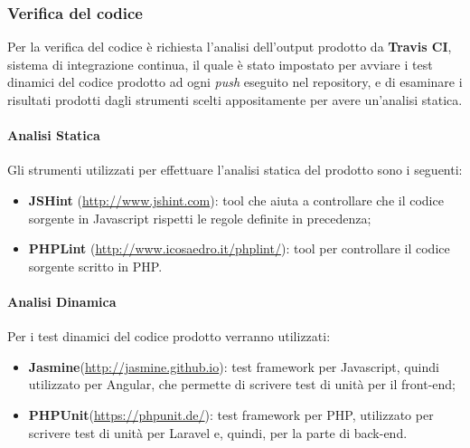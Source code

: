 \subsubsection{Verifica del codice}
Per la verifica del codice è richiesta l'analisi dell'output prodotto da \textbf{Travis CI}, sistema di integrazione continua, il quale è stato impostato per avviare i test dinamici del codice prodotto ad ogni \textit{push} eseguito nel \gls{repository}, e di esaminare i risultati prodotti dagli strumenti scelti appositamente per avere un'analisi statica.

	\paragraph{Analisi Statica}
	Gli strumenti utilizzati per effettuare l'analisi statica del prodotto sono i seguenti:
	\begin{itemize}
		\item \textbf{JSHint} (\url{http://www.jshint.com}): tool che aiuta a controllare che il codice sorgente in \gls{Javascript} rispetti le regole definite in precedenza;
		\item \textbf{PHPLint} (\url{http://www.icosaedro.it/phplint/}): tool per controllare il codice sorgente scritto in \gls{PHP}.
	\end{itemize}
	
	\paragraph{Analisi Dinamica}
	Per i test dinamici del codice prodotto verranno utilizzati:
	\begin{itemize}
		\item \textbf{Jasmine}(\url{http://jasmine.github.io}): test \gls{framework} per \gls{Javascript}, quindi utilizzato per \gls{Angular}, che permette di scrivere test di unità per il \gls{front-end};
		\item \textbf{PHPUnit}(\url{https://phpunit.de/}): test \gls{framework} per \gls{PHP}, utilizzato per scrivere test di unità per Laravel e, quindi, per la parte di \gls{back-end}.
	\end{itemize}
	
